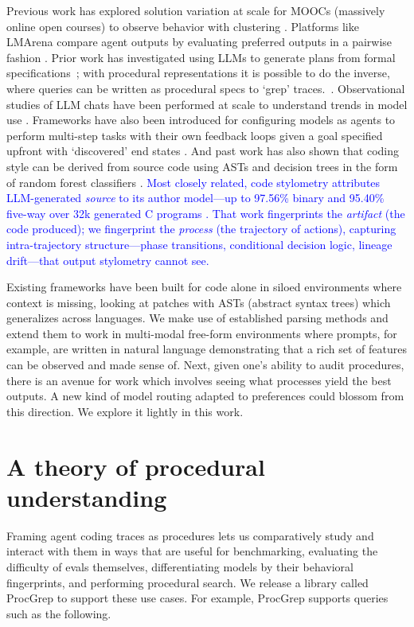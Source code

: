 \documentclass[12pt]{article}
\begin{document}
Previous work has explored solution variation at scale for MOOCs (massively online open courses) to observe behavior with clustering \cite{glassman2015overcode}. Platforms like LMArena compare agent outputs by evaluating preferred outputs in a pairwise fashion \cite{chiang2024chatbotarenaopenplatform}. Prior work has investigated using LLMs to generate plans from formal specifications~\cite{silver2024generalized}; with procedural representations it is possible to do the inverse, where queries can be written as procedural specs to `grep' traces.~\cite{yin2017syntacticneuralmodelgeneralpurpose}. Observational studies of LLM chats have been performed at scale to understand trends in model use \cite{tamkin2024clioprivacypreservinginsightsrealworld, deming2025how}. Frameworks have also been introduced for configuring models as agents to perform multi-step tasks with their own feedback loops given a goal specified upfront with `discovered' end states \cite{yao2023reactsynergizingreasoningacting}. And past work has also shown that coding style can be derived from source code using ASTs and decision trees in the form of random forest classifiers \cite{code_stylometry}. \textcolor{blue}{Most closely related, code stylometry attributes LLM-generated \emph{source} to its author model---up to 97.56\% binary and 95.40\% five-way over 32k generated C programs \cite{bisztray2025iknowllmwrote}. That work fingerprints the \emph{artifact} (the code produced); we fingerprint the \emph{process} (the trajectory of actions), capturing intra-trajectory structure---phase transitions, conditional decision logic, lineage drift---that output stylometry cannot see.}

Existing frameworks have been built for code alone in siloed environments where context is missing, looking at patches \cite{GumTree2014, yin-neubig-2017-syntactic} with ASTs (abstract syntax trees) which generalizes across languages. We make use of established parsing methods and extend them to work in multi-modal free-form environments where prompts, for example, are written in natural language \cite{cruz2026textastherichestpreferencesignal} demonstrating that a rich set of features can be observed and made sense of. Next, given one's ability to audit procedures, there is an avenue for work which involves seeing what processes yield the best outputs. A new kind of model routing adapted to preferences could blossom from this direction. We explore it lightly in this work.

\section{A theory of procedural understanding}
Framing agent coding traces as procedures lets us comparatively study and interact with them in ways that are useful for benchmarking, evaluating the difficulty of evals themselves, differentiating models by their behavioral fingerprints, and performing procedural search. We release a library called ProcGrep to support these use cases. For example, ProcGrep supports queries such as the following.
\end{document}
